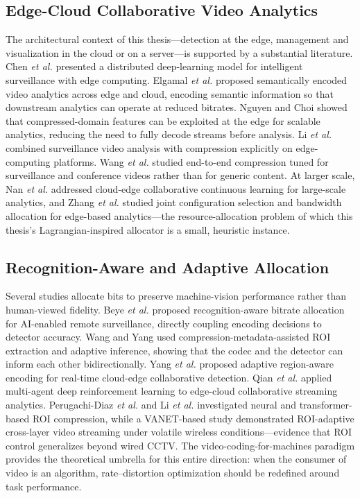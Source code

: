 \subsection{Edge-Cloud Collaborative Video Analytics}

The architectural context of this thesis---detection at the edge, management and visualization in the cloud or on a server---is supported by a substantial literature. Chen \textit{et al.} \cite{Chen2019DIVS} presented a distributed deep-learning model for intelligent surveillance with edge computing. Elgamal \textit{et al.} \cite{Elgamal2020SIEVE} proposed semantically encoded video analytics across edge and cloud, encoding semantic information so that downstream analytics can operate at reduced bitrates. Nguyen and Choi \cite{Nguyen2020Scalable} showed that compressed-domain features can be exploited at the edge for scalable analytics, reducing the need to fully decode streams before analysis. Li \textit{et al.} \cite{Li2022EdgeComp} combined surveillance video analysis with compression explicitly on edge-computing platforms. Wang \textit{et al.} \cite{Wang2022E2ESurv} studied end-to-end compression tuned for surveillance and conference videos rather than for generic content. At larger scale, Nan \textit{et al.} \cite{Nan2023Collaborative} addressed cloud-edge collaborative continuous learning for large-scale analytics, and Zhang \textit{et al.} \cite{Zhang2022JCAB} studied joint configuration selection and bandwidth allocation for edge-based analytics---the resource-allocation problem of which this thesis's Lagrangian-inspired allocator is a small, heuristic instance.

\subsection{Recognition-Aware and Adaptive Allocation}

Several studies allocate bits to preserve machine-vision performance rather than human-viewed fidelity. Beye \textit{et al.} \cite{Beye2023Recognition} proposed recognition-aware bitrate allocation for AI-enabled remote surveillance, directly coupling encoding decisions to detector accuracy. Wang and Yang \cite{Wang2025Metadata} used compression-metadata-assisted ROI extraction and adaptive inference, showing that the codec and the detector can inform each other bidirectionally. Yang \textit{et al.} \cite{Yang2025RegionAware} proposed adaptive region-aware encoding for real-time cloud-edge collaborative detection. Qian \textit{et al.} \cite{Qian2025OsmoticGate} applied multi-agent deep reinforcement learning to edge-cloud collaborative streaming analytics. Perugachi-Diaz \textit{et al.} \cite{Perugachi2022NeuralROI} and Li \textit{et al.} \cite{Li2023SwinROI} investigated neural and transformer-based ROI compression, while a VANET-based study \cite{VANET2023ROI} demonstrated ROI-adaptive cross-layer video streaming under volatile wireless conditions---evidence that ROI control generalizes beyond wired CCTV. The video-coding-for-machines paradigm \cite{Duan2020VCM} provides the theoretical umbrella for this entire direction: when the consumer of video is an algorithm, rate--distortion optimization should be redefined around task performance.

